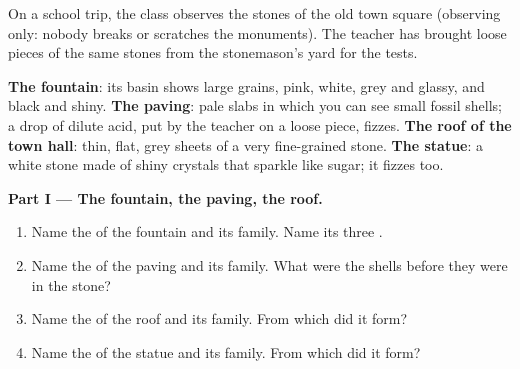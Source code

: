 \begin{problem}
\label{pb:g6:rocks-and-minerals:1}
On a school trip, the class observes the stones of the old town square
(observing only: nobody breaks or scratches the monuments). The teacher
has brought loose pieces of the same stones from the stonemason's yard for
the  tests.

\smallskip
\noindent\textbf{The fountain}: its basin shows large grains, pink, white,
        grey and glassy, and black and shiny.
\textbf{The paving}: pale slabs in which you can see small fossil
        shells; a drop of dilute acid, put by the teacher on a loose piece,
        fizzes.
\textbf{The roof of the town hall}: thin, flat, grey sheets of a
        very fine-grained stone.
\textbf{The statue}: a white stone made of shiny crystals that
        sparkle like sugar; it fizzes too.

\medskip
\noindent\textbf{Part I --- The fountain, the paving, the roof.}
\begin{enumerate}
  \item Name the  of the fountain and its family. Name its three
        .
  \item Name the  of the paving and its family. What were the shells
        before they were in the stone?
  \item Name the  of the roof and its family. From which  did it
        form?
  \item Name the  of the statue and its family. From which  did it
        form?
\end{enumerate}


\end{problem}
